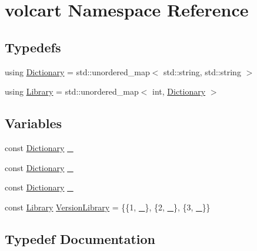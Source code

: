 \hypertarget{namespacevolcart}{}\section{volcart Namespace Reference}
\label{namespacevolcart}
\subsection*{Typedefs}
\begin{DoxyCompactItemize}
\item 
using \hyperlink{namespacevolcart_aa4e334ff80b678b9556aee59618eb37a}{Dictionary} = std\+::unordered\+\_\+map$<$ std\+::string, std\+::string $>$
\item 
using \hyperlink{namespacevolcart_a90354e3717094cf66f2c1310f12b2e4e}{Library} = std\+::unordered\+\_\+map$<$ int, \hyperlink{namespacevolcart_aa4e334ff80b678b9556aee59618eb37a}{Dictionary} $>$
\end{DoxyCompactItemize}
\subsection*{Variables}
\begin{DoxyCompactItemize}
\item 
const \hyperlink{namespacevolcart_aa4e334ff80b678b9556aee59618eb37a}{Dictionary} \hyperlink{namespacevolcart_aff81b62f1e73f2f96669772bab7e2425}{\+\_}
\item 
const \hyperlink{namespacevolcart_aa4e334ff80b678b9556aee59618eb37a}{Dictionary} \hyperlink{namespacevolcart_aa72ffe0fec32eedd0bba8af24e731287}{\+\_}
\item 
const \hyperlink{namespacevolcart_aa4e334ff80b678b9556aee59618eb37a}{Dictionary} \hyperlink{namespacevolcart_ab457f3dd0e44ebc4ef1ed01c7569938a}{\+\_}
\item 
const \hyperlink{namespacevolcart_a90354e3717094cf66f2c1310f12b2e4e}{Library} \hyperlink{namespacevolcart_a6e45df2f7fa06672b646f6d8dc5ca256}{Version\+Library} = \{\{1, \hyperlink{namespacevolcart_aff81b62f1e73f2f96669772bab7e2425}{\+\_}\}, \{2, \hyperlink{namespacevolcart_aa72ffe0fec32eedd0bba8af24e731287}{\+\_}\}, \{3, \hyperlink{namespacevolcart_ab457f3dd0e44ebc4ef1ed01c7569938a}{\+\_}\}\}
\end{DoxyCompactItemize}


\subsection{Typedef Documentation}
\hypertarget{namespacevolcart_aa4e334ff80b678b9556aee59618eb37a}{}\label{namespacevolcart_aa4e334ff80b678b9556aee59618eb37a} 
